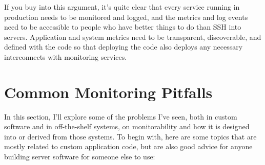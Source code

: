 \documentclass{vivid_layout}
\begin{document}
If you buy into this argument, it's quite clear that every service running in
production needs to be monitored and logged, and the metrics and log events need
to be accessible to people who have better things to do than SSH into
servers. Application and system metrics need to be transparent, discoverable,
and defined with the code so that deploying the code also deploys any necessary
interconnects with monitoring services.

\section{Common Monitoring Pitfalls}

In this section, I'll explore some of the problems I've seen, both in custom
software and in off-the-shelf systems, on monitorability and how it
is designed into or derived from those systems. To begin with, here are some
topics that are mostly related to custom application code, but are also good
advice for anyone building server software for someone else to use:
\end{document}
